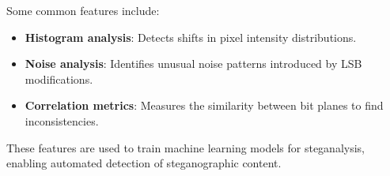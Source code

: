 \documentclass{article}
\begin{document}
Some common features include:
\begin{itemize}
\item \textbf{Histogram analysis}: Detects shifts in pixel intensity distributions.
\item \textbf{Noise analysis}: Identifies unusual noise patterns introduced by LSB modifications.
\item \textbf{Correlation metrics}: Measures the similarity between bit planes to find inconsistencies.
\end{itemize}

These features are used to train machine learning models for steganalysis, enabling automated detection of steganographic content.
\end{document}
